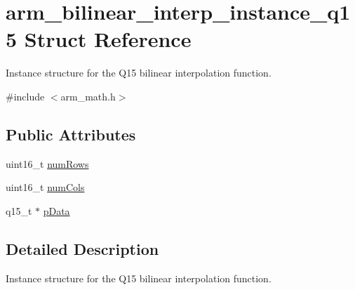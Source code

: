 \hypertarget{structarm__bilinear__interp__instance__q15}{\section{arm\-\_\-bilinear\-\_\-interp\-\_\-instance\-\_\-q15 Struct Reference}
\label{structarm__bilinear__interp__instance__q15}
}


Instance structure for the Q15 bilinear interpolation function.  




{\ttfamily \#include $<$arm\-\_\-math.\-h$>$}

\subsection*{Public Attributes}
\begin{DoxyCompactItemize}
\item 
uint16\-\_\-t \hyperlink{structarm__bilinear__interp__instance__q15_a2130ae30a804995a9f5d0e2189e08565}{num\-Rows}
\item 
uint16\-\_\-t \hyperlink{structarm__bilinear__interp__instance__q15_a7fa8772d01583374ff8ac18205a26a37}{num\-Cols}
\item 
q15\-\_\-t $\ast$ \hyperlink{structarm__bilinear__interp__instance__q15_a50d75b1316cee3e0dfad6dcc4c9a2954}{p\-Data}
\end{DoxyCompactItemize}


\subsection{Detailed Description}
Instance structure for the Q15 bilinear interpolation function. 

